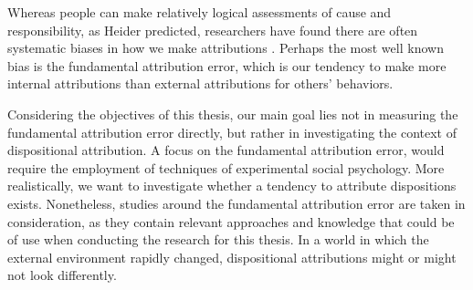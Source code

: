 

Whereas people can make relatively logical assessments of cause and responsibility, as Heider predicted, researchers have found there are often systematic biases in how we make attributions \cite{Ross1977}. Perhaps the most well known bias is the fundamental attribution error, which is our tendency to make more internal attributions than external attributions for others’ behaviors. 

Considering the objectives of this thesis, our main goal lies not in measuring the fundamental attribution error directly, but rather in investigating the context of dispositional attribution. A focus on the fundamental attribution error, would require the employment of techniques of experimental social psychology. More realistically, we want to investigate whether a tendency to attribute dispositions exists. Nonetheless, studies around the fundamental attribution error are taken in consideration, as they contain relevant approaches and knowledge that could be of use when conducting the research for this thesis.  In a world in which the external environment rapidly changed, dispositional attributions might or might not look differently. 


